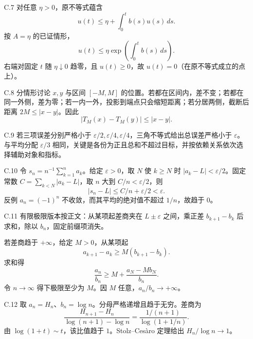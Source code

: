 \begin{solution}{C.7}
对任意 \(\eta>0\)，原不等式蕴含
\[
 u(t)\le \eta+\int_0^tb(s)u(s)\,ds.
\]
按 \(A=\eta\) 的已证情形，
\[
 u(t)\le\eta\exp\left(\int_0^tb(s)\,ds\right).
\]
右端对固定 \(t\) 随 \(\eta\downarrow0\) 趋零，且 \(u(t)\ge0\)，故 \(u(t)=0\)（在原不等式成立的点上）。
\end{solution}

\begin{solution}{C.8}
分情形讨论 \(x,y\) 与区间 \([-M,M]\) 的位置。若都在区间内，差不变；若都在同一外侧，差为零；若一内一外，投影到端点只会缩短距离；若分居两侧，截断后距离 \(2M\le|x-y|\)。因此
\[
 |T_M(x)-T_M(y)|\le|x-y|.
\]
\end{solution}

\begin{solution}{C.9}
若三项误差分别严格小于 \(\varepsilon/2,\varepsilon/4,\varepsilon/4\)，三角不等式给出总误差严格小于 \(\varepsilon\)。与平均分配 \(\varepsilon/3\) 相同，关键是各份为正且总和不超过目标，并按依赖关系依次选择辅助对象和指标。
\end{solution}

\begin{solution}{C.10}
令 \(s_n=n^{-1}\sum_{k=1}^na_k\)。给定 \(\varepsilon>0\)，取 \(N\) 使 \(k\ge N\) 时 \(|a_k-L|<\varepsilon/2\)。固定常数 \(C=\sum_{k<N}|a_k-L|\)，取 \(n\) 大到 \(C/n<\varepsilon/2\)，则
\[
 |s_n-L|\le C/n+\varepsilon/2<\varepsilon.
\]
反例 \(a_n=(-1)^n\) 不收敛，而其平均的绝对值不超过 \(1/n\)，故趋于 \(0\)。
\end{solution}

\begin{solution}{C.11}
有限极限版本按正文：从某项起差商夹在 \(L\pm\varepsilon\) 之间，乘正差 \(b_{k+1}-b_k\) 后求和，除以 \(b_n\)，固定前缀项消失。

若差商趋于 \(+\infty\)，给定 \(M>0\)，从某项起
\[
 a_{k+1}-a_k\ge M(b_{k+1}-b_k).
\]
求和得
\[
 \frac{a_n}{b_n}\ge
 M+\frac{a_N-Mb_N}{b_n}.
\]
令 \(n\to\infty\) 得下极限至少为 \(M\)。因 \(M\) 任意，\(a_n/b_n\to+\infty\)。
\end{solution}

\begin{solution}{C.12}
取 \(a_n=H_n\)、\(b_n=\log n\)。分母严格递增且趋于无穷。差商为
\[
 \frac{H_{n+1}-H_n}{\log(n+1)-\log n}
 =\frac{1/(n+1)}{\log(1+1/n)}.
\]
由 \(\log(1+t)\sim t\)，该比值趋于 \(1\)。Stolz--Cesàro 定理给出 \(H_n/\log n\to1\)。
\end{solution}
